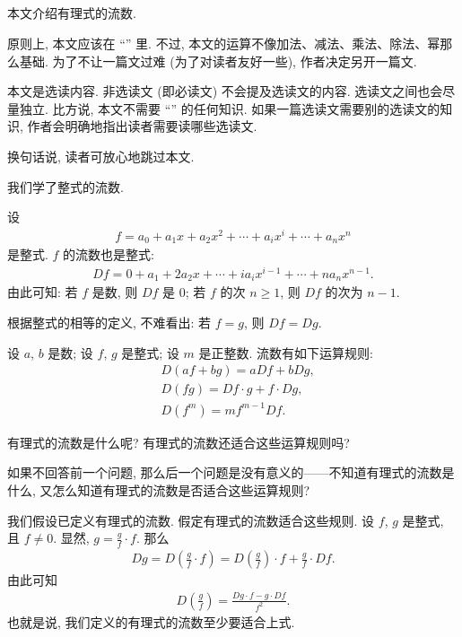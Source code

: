 \subsection*{\FluxionsOfRationalExpressions}
\markright{\FluxionsOfRationalExpressions}

本文介绍有理式的流数.

原则上, 本文应该在 ``\OperationsOnRationalExprsssions'' 里. 不过, 本文的运算不像加法、减法、乘法、除法、幂那么基础. 为了不让一篇文过难 (为了对读者友好一些), 作者决定另开一篇文.

本文是选读内容. 非选读文 (即必读文) 不会提及选读文的内容. 选读文之间也会尽量独立. 比方说, 本文不需要 ``\CompositionOfRationalExpressions'' 的任何知识. 如果一篇选读文需要别的选读文的知识, 作者会明确地指出读者需要读哪些选读文.

换句话说, 读者可放心地跳过本文.

\myLine

我们学了整式的流数.

设
\begin{align*}
    f = a_0 + a_1 x + a_2 x^2 + \cdots + a_i x^i + \cdots + a_n x^n
\end{align*}
是整式. $f$ 的流数也是整式:
\begin{align*}
    Df = 0 + a_1 + 2a_2 x + \cdots + i a_i x^{i-1} + \cdots + n a_n x^{n-1}.
\end{align*}
由此可知: 若 $f$ 是数, 则 $Df$ 是 $0$; 若 $f$ 的次 $n \geq 1$, 则 $Df$ 的次为 $n - 1$.

根据整式的相等的定义, 不难看出: 若 $f = g$, 则 $Df = Dg$.

设 $a$, $b$ 是数; 设 $f$, $g$ 是整式; 设 $m$ 是正整数. 流数有如下运算规则:
\begin{align*}
     & D(af + bg) = aDf + bDg,          \\
     & D(fg) = Df \cdot g + f \cdot Dg, \\
     & D(f^m) = mf^{m-1} Df.
\end{align*}

有理式的流数是什么呢? 有理式的流数还适合这些运算规则吗?

如果不回答前一个问题, 那么后一个问题是没有意义的——不知道有理式的流数是什么, 又怎么知道有理式的流数是否适合这些运算规则?

我们假设已定义有理式的流数. 假定有理式的流数适合这些规则. 设 $f$, $g$ 是整式, 且 $f \neq 0$. 显然, $g = \frac{g}{f} \cdot f$. 那么
\begin{align*}
    Dg = D \left( \frac{g}{f} \cdot f \right) = D\left( \frac{g}{f} \right) \cdot f + \frac{g}{f} \cdot Df.
\end{align*}
由此可知
\begin{align*}
    D \left( \frac{g}{f} \right) = \frac{Dg \cdot f - g \cdot Df}{f^2}.
\end{align*}
也就是说, 我们定义的有理式的流数至少要适合上式.

